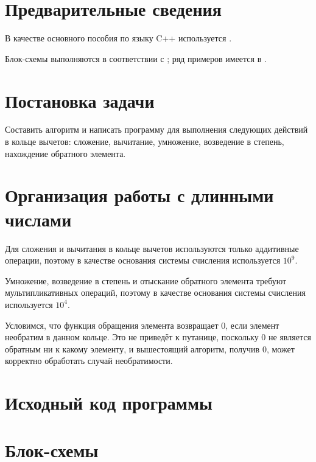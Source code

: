 \documentclass[a4paper,12pt]{article} %
\begin{document}
\setcounter{page}{2}

\section*{Предварительные сведения}

В качестве основного пособия по языку C++ используется \cite{chmyhalo}.


Блок-схемы выполняются в соответствии с \cite{gost-block-scheme};
ряд примеров имеется в \cite{wiki-block-scheme}.


\section*{Постановка задачи}
Составить алгоритм и написать программу
для выполнения следующих действий в кольце вычетов:
сложение, вычитание, умножение, возведение в степень,
нахождение обратного элемента.


\section*{Организация работы с длинными числами}
Для сложения и вычитания в кольце вычетов используются только аддитивные операции,
поэтому в качестве основания системы счисления используется $10^9$.

Умножение, возведение в степень и отыскание обратного элемента требуют
мультипликативных операций,
поэтому в качестве основания системы счисления используется $10^4$.

Условимся, что функция обращения элемента возвращает 0,
если элемент необратим в данном кольце.
Это не приведёт к путанице, поскольку 0 не является обратным ни к какому элементу,
и вышестоящий алгоритм, получив 0, может корректно обработать случай необратимости.


\section*{Исходный код программы}








\section*{Блок-схемы}
\end{document}
